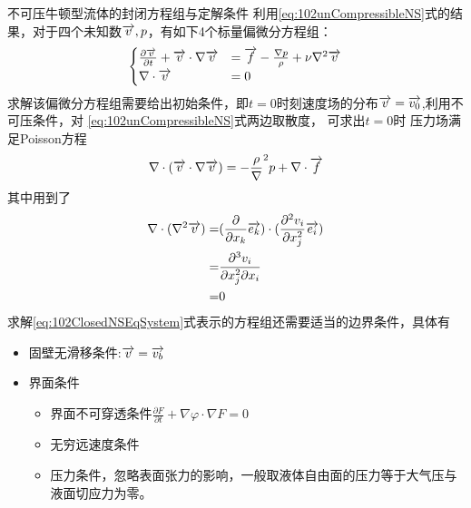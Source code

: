 不可压牛顿型流体的封闭方程组与定解条件
利用\eqref{eq:102unCompressibleNS}式的结果，对于四个未知数$\overrightarrow{v},p$，有如下4个标量偏微分方程组：
\begin{equation}\label{eq:102ClosedNSEqSystem}
\begin{cases}
\frac{\partial \overrightarrow{v}}{\partial t}+\overrightarrow{v}\cdot\nabla\overrightarrow{v}&=\overrightarrow{f}-\frac{\nabla p}{\rho}+\nu \nabla^2 \overrightarrow{v}\\
\nabla\cdot\overrightarrow{v}&=0
\end{cases}
\end{equation}
求解该偏微分方程组需要给出初始条件，即$t=0$时刻速度场的分布$\overrightarrow{v}=\overrightarrow{v_0}$,利用不可压条件，对
\eqref{eq:102unCompressibleNS}式两边取散度，
可求出$t=0$时
压力场满足Poisson方程
\begin{equation}
\nabla\cdot(\overrightarrow{v}\cdot\nabla\overrightarrow{v})=-\frac{\rho}\nabla^2 p +\nabla\cdot \overrightarrow{f}
\end{equation}
其中用到了
\begin{align*}
\nabla\cdot(\nabla^2 \overrightarrow{v}) = & (\frac{\partial}{\partial x_k}\overrightarrow{e_k})\cdot (\frac{\partial^2 v_i}{\partial x_j^2}\overrightarrow{e_i})\\
= & \frac{\partial^3 v_i}{\partial x_j^2\partial x_i} \\
= & 0
\end{align*}
求解\eqref{eq:102ClosedNSEqSystem}式表示的方程组还需要适当的边界条件，具体有
\begin{itemize}
\item 固壁无滑移条件:$\overrightarrow{v}=\overrightarrow{v_b}$
\item 界面条件
    \begin{itemize}
    \item 界面不可穿透条件$\frac{\partial F}{\partial t}+\nabla \varphi \cdot \nabla F=0$
    \item 无穷远速度条件
    \item 压力条件，忽略表面张力的影响，一般取液体自由面的压力等于大气压与液面切应力为零。
    \end{itemize}
\end{itemize}
